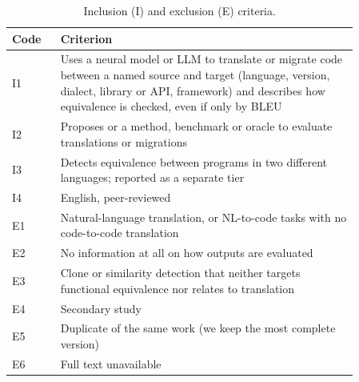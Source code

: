 \begin{table}[t]
  \centering
  \caption{Inclusion (I) and exclusion (E) criteria.}
  \label{tab:criteria}
  \small
  \begin{tabular}{@{}l P{0.86\linewidth}@{}}
    \toprule
    Code & Criterion \\
    \midrule
    I1 & Uses a neural model or LLM to translate or migrate code between a named source and target (language, version, dialect, library or API, framework) and describes how equivalence is checked, even if only by BLEU \\
    I2 & Proposes or  a method, benchmark or oracle to evaluate translations or migrations \\
    I3 & Detects equivalence between programs in two different languages; reported as a separate tier \\
    I4 & English, peer-reviewed \\
    \midrule
    E1 & Natural-language translation, or NL-to-code tasks with no code-to-code translation \\
    E2 & No information at all on how outputs are evaluated \\
    E3 & Clone or similarity detection that neither targets functional equivalence nor relates to translation \\
    E4 & Secondary study \\
    E5 & Duplicate of the same work (we keep the most complete version) \\
    E6 & Full text unavailable \\
    \bottomrule
  \end{tabular}
\end{table}

